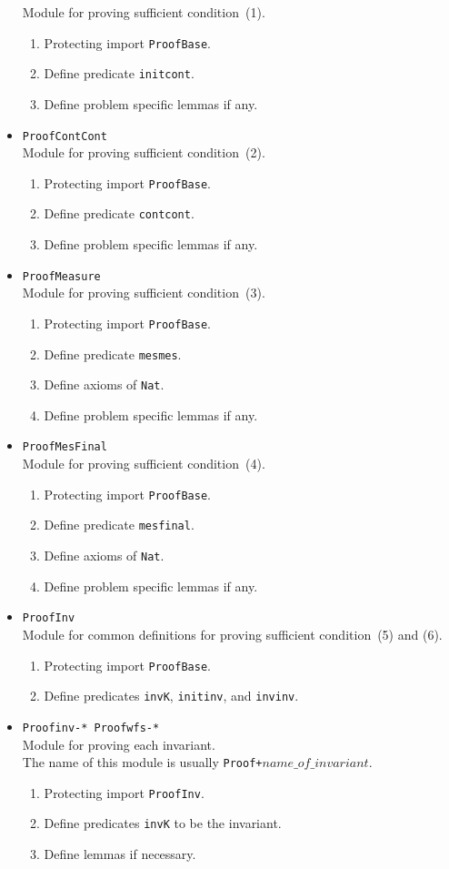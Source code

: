 \documentclass[12pt]{report}
\begin{document}
\begin{itemize}
  Module for proving sufficient condition~(1).
  \begin{enumerate}
  \item Protecting import {\tt ProofBase}.
  \item Define predicate {\tt initcont}.
  \item Define problem specific lemmas if any.
  \end{enumerate}
\item {\tt ProofContCont}\\
  Module for proving sufficient condition~(2).
  \begin{enumerate}
  \item Protecting import {\tt ProofBase}.
  \item Define predicate {\tt contcont}.
  \item Define problem specific lemmas if any.
  \end{enumerate}
\item {\tt ProofMeasure}\\
  Module for proving sufficient condition~(3).
  \begin{enumerate}
  \item Protecting import {\tt ProofBase}.
  \item Define predicate {\tt mesmes}.
  \item Define axioms of {\tt Nat}.
  \item Define problem specific lemmas if any.
  \end{enumerate}
\item {\tt ProofMesFinal}\\
  Module for proving sufficient condition~(4).
  \begin{enumerate}
  \item Protecting import {\tt ProofBase}.
  \item Define predicate {\tt mesfinal}.
  \item Define axioms of {\tt Nat}.
  \item Define problem specific lemmas if any.
  \end{enumerate}
\item {\tt ProofInv}\\
  Module for common definitions for proving sufficient
  condition~(5) and (6).
  \begin{enumerate}
  \item Protecting import {\tt ProofBase}.
  \item Define predicates {\tt invK}, {\tt initinv}, and {\tt invinv}.
  \end{enumerate}
\item {\tt Proofinv-*  Proofwfs-*}\\
  Module for proving each invariant. \\The name of this module is usually
  {\tt Proof+}$name\_of\_invariant$.
  \begin{enumerate}
  \item Protecting import {\tt ProofInv}.
  \item Define predicates {\tt invK} to be the invariant.
  \item Define lemmas if necessary.
  \end{enumerate}
\end{itemize}
\end{document}
